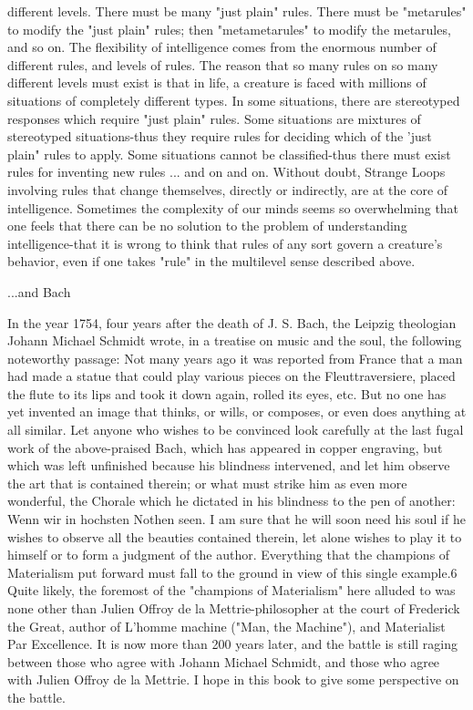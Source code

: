 different levels. There must be many "just plain" rules. There must be "metarules" to modify the "just plain" rules; then "metametarules" to modify the metarules, and so on. The flexibility of intelligence comes from the enormous number of different rules, and levels of rules. The reason that so many rules on so many different levels must exist is that in life, a creature is faced with millions of situations of completely different types. In some situations, there are stereotyped responses which require "just plain" rules. Some situations are mixtures of stereotyped situations-thus they require rules for deciding which of the 'just plain" rules to apply. Some situations cannot be classified-thus there must exist rules for inventing new rules ... and on and on. Without doubt, Strange Loops involving rules that change themselves, directly or indirectly, are at the core of intelligence. Sometimes the complexity of our minds seems so overwhelming that one feels that there can be no solution to the problem of understanding intelligence-that it is wrong to think that rules of any sort govern a creature's behavior, even if one takes "rule" in the multilevel sense described above. 

...and Bach 

In the year 1754, four years after the death of J. S. Bach, the Leipzig theologian Johann Michael Schmidt wrote, in a treatise on music and the soul, the following noteworthy passage: Not many years ago it was reported from France that a man had made a statue that could play various pieces on the Fleuttraversiere, placed the flute to its lips and took it down again, rolled its eyes, etc. But no one has yet invented an image that thinks, or wills, or composes, or even does anything at all similar. Let anyone who wishes to be convinced look carefully at the last fugal work of the above-praised Bach, which has appeared in copper engraving, but which was left unfinished because his blindness intervened, and let him observe the art that is contained therein; or what must strike him as even more wonderful, the Chorale which he dictated in his blindness to the pen of another: Wenn wir in hochsten Nothen seen. I am sure that he will soon need his soul if he wishes to observe all the beauties contained therein, let alone wishes to play it to himself or to form a judgment of the author. Everything that the champions of Materialism put forward must fall to the ground in view of this single example.6 Quite likely, the foremost of the "champions of Materialism" here alluded to was none other than Julien Offroy de la Mettrie-philosopher at the court of Frederick the Great, author of L'homme machine ("Man, the Machine"), and Materialist Par Excellence. It is now more than 200 years later, and the battle is still raging between those who agree with Johann Michael Schmidt, and those who agree with Julien Offroy de la Mettrie. I hope in this book to give some perspective on the battle. 

